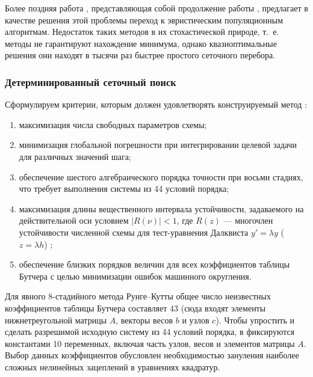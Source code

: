 Более поздняя работа \cite{Anastassi2025}, представляющая собой продолжение работы \cite{Anastassi2023}, предлагает в качестве решения этой проблемы переход к эвристическим популяционным алгоритмам. Недостаток таких методов в их стохастической природе, т.~е. методы не гарантируют нахождение минимума, однако квазиоптимальные решения они находят в тысячи раз быстрее простого сеточного перебора.

\subsubsection{Детерминированный сеточный поиск}
Сформулируем критерии, которым должен удовлетворять конструируемый метод \cite{Anastassi2023}:
\begin{enumerate}
	\item максимизация числа свободных параметров схемы;
	\item минимизация глобальной погрешности при интегрировании целевой задачи для различных значений шага;
	\item обеспечение шестого алгебраического порядка точности при восьми стадиях, что требует выполнения системы из 44 условий порядка;
	\item максимизация длины вещественного интервала устойчивости, задаваемого на действительной оси условием $|R(\nu)| < 1$, где $R(z)$ — многочлен устойчивости численной схемы для тест-уравнения Далквиста $y' = \lambda y$ ($z = \lambda h$) \cite{Butcher2008};
	\item обеспечение близких порядков величин для всех коэффициентов таблицы Бутчера с целью минимизации ошибок машинного округления.
\end{enumerate}

Для явного 8-стадийного метода Рунге--Кутты общее число неизвестных коэффициентов таблицы Бутчера составляет 43 (сюда входят элементы нижнетреугольной матрицы $A$, векторы весов $b$ и узлов $c$). Чтобы упростить и сделать разрешимой исходную систему из 44 условий порядка, в \cite{Anastassi2023} фиксируются константами 10 переменных, включая часть узлов, весов и элементов матрицы $A$. Выбор данных коэффициентов обусловлен необходимостью зануления наиболее сложных нелинейных зацеплений в уравнениях квадратур. 

